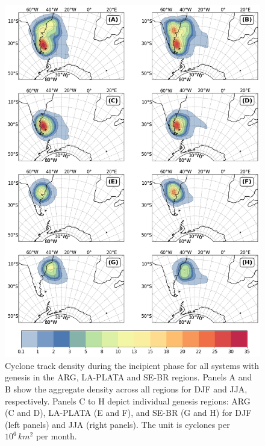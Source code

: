 \begin{figure}[!htbp]
\centering
\includegraphics[width=\textwidth]{figs_4/density_map_incipient.png}
\caption[Track Density - Incipient Phase]{Cyclone track density during the incipient phase for all systems with genesis in the ARG, LA-PLATA and SE-BR regions. Panels A and B show the aggregate density across all regions for DJF and JJA, respectively. Panels C to H depict individual genesis regions: ARG (C and D), LA-PLATA (E and F), and SE-BR (G and H) for DJF (left panels) and JJA (right panels). The unit is cyclones per \(10^6 \, km^2\) per month.}
\label{fig:density_map_incipient}
\end{figure}

